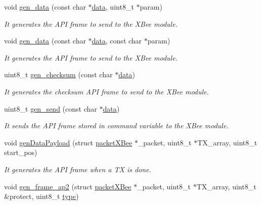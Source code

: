 \begin{DoxyCompactItemize}
void \hyperlink{class_wasp_x_bee_core_a1b026d7365782993512ea64be7f415d1}{gen\+\_\+data} (const char $\ast$\hyperlink{class_wasp_x_bee_core_a81f1c2af5c45fc8e3b63f8f21b3df17f}{data}, uint8\+\_\+t $\ast$param)
\begin{DoxyCompactList}\small\item\em It generates the A\+PI frame to send to the X\+Bee module. \end{DoxyCompactList}\item 
void \hyperlink{class_wasp_x_bee_core_aa63bde13fccd75b22d04dea7768118cc}{gen\+\_\+data} (const char $\ast$\hyperlink{class_wasp_x_bee_core_a81f1c2af5c45fc8e3b63f8f21b3df17f}{data}, const char $\ast$param)
\begin{DoxyCompactList}\small\item\em It generates the A\+PI frame to send to the X\+Bee module. \end{DoxyCompactList}\item 
uint8\+\_\+t \hyperlink{class_wasp_x_bee_core_a67117d5a25099a579800b3af76d1864d}{gen\+\_\+checksum} (const char $\ast$\hyperlink{class_wasp_x_bee_core_a81f1c2af5c45fc8e3b63f8f21b3df17f}{data})
\begin{DoxyCompactList}\small\item\em It generates the checksum A\+PI frame to send to the X\+Bee module. \end{DoxyCompactList}\item 
uint8\+\_\+t \hyperlink{class_wasp_x_bee_core_a95062ec9931704dd9438f0d411cc12a0}{gen\+\_\+send} (const char $\ast$\hyperlink{class_wasp_x_bee_core_a81f1c2af5c45fc8e3b63f8f21b3df17f}{data})
\begin{DoxyCompactList}\small\item\em It sends the A\+PI frame stored in \textquotesingle{}command\textquotesingle{} variable to the X\+Bee module. \end{DoxyCompactList}\item 
void \hyperlink{class_wasp_x_bee_core_a15fdc0260cbad48ab6642f930906af2a}{gen\+Data\+Payload} (struct \hyperlink{structpacket_x_bee}{packet\+X\+Bee} $\ast$\+\_\+packet, uint8\+\_\+t $\ast$T\+X\+\_\+array, uint8\+\_\+t start\+\_\+pos)
\begin{DoxyCompactList}\small\item\em It generates the A\+PI frame when a TX is done. \end{DoxyCompactList}\item 
void \hyperlink{class_wasp_x_bee_core_a64102c18925942c6abfc3a36450bb127}{gen\+\_\+frame\+\_\+ap2} (struct \hyperlink{structpacket_x_bee}{packet\+X\+Bee} $\ast$\+\_\+packet, uint8\+\_\+t $\ast$T\+X\+\_\+array, uint8\+\_\+t \&protect, uint8\+\_\+t \hyperlink{_sd_fat_structs_8h_a1d127017fb298b889f4ba24752d08b8e}{type})

\end{DoxyCompactItemize}
